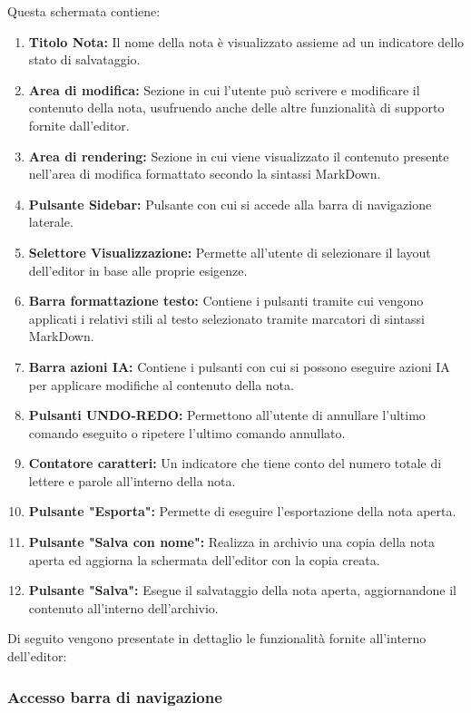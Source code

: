 \documentclass[a4paper,10pt]{article}
\begin{document}
Questa schermata contiene:
\begin{enumerate}
  \item \textbf{Titolo Nota:} Il nome della nota è visualizzato assieme ad un indicatore dello stato di salvataggio.
  \item \textbf{Area di modifica:} Sezione in cui l'utente può scrivere e modificare il contenuto della nota, usufruendo anche delle altre funzionalità di supporto fornite dall'editor.
  \item \textbf{Area di rendering:} Sezione in cui viene visualizzato il contenuto presente nell'area di modifica formattato secondo la sintassi MarkDown.
  \item \textbf{Pulsante Sidebar:} Pulsante con cui si accede alla barra di navigazione laterale.
  \item \textbf{Selettore Visualizzazione:} Permette all'utente di selezionare il layout dell'editor in base alle proprie esigenze.
  \item \textbf{Barra formattazione testo:} Contiene i pulsanti tramite cui vengono applicati i relativi stili al testo selezionato tramite marcatori di sintassi MarkDown.
  \item \textbf{Barra azioni IA:} Contiene i pulsanti con cui si possono eseguire azioni IA per applicare modifiche al contenuto della nota.
  \item \textbf{Pulsanti UNDO-REDO:} Permettono all'utente di annullare l'ultimo comando eseguito o ripetere l'ultimo comando annullato. 
  \item \textbf{Contatore caratteri:} Un indicatore che tiene conto del numero totale di lettere e parole all'interno della nota.
  \item \textbf{Pulsante "Esporta":} Permette di eseguire l'esportazione della nota aperta.
  \item \textbf{Pulsante "Salva con nome":} Realizza in archivio una copia della nota aperta ed aggiorna la schermata dell'editor con la copia creata. 
  \item \textbf{Pulsante "Salva":} Esegue il salvataggio della nota aperta, aggiornandone il contenuto all'interno dell'archivio.
\end{enumerate}

Di seguito vengono presentate in dettaglio le funzionalità fornite all'interno dell'editor:

  \subsubsection{Accesso barra di navigazione}
\end{document}
